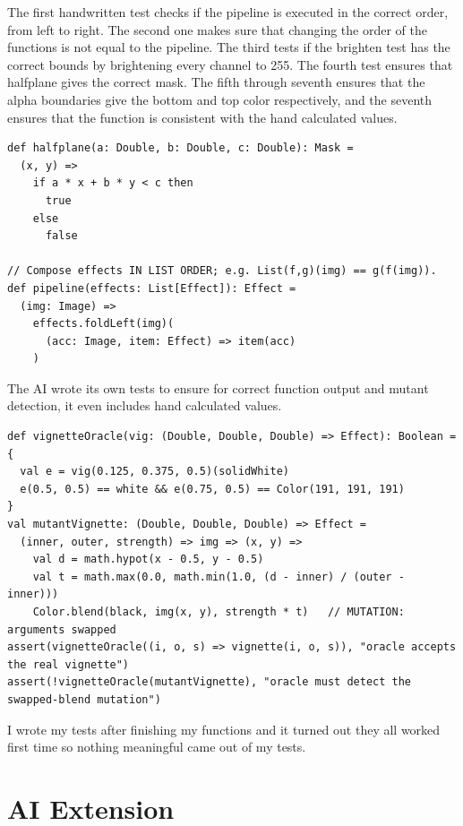 \documentclass[11pt,letterpaper]{article}
\newcommand{\code}[1]{\texttt{#1}}
\begin{document}
The first handwritten test checks if the pipeline is executed in the correct order, from left to right. The second one makes sure that changing the order of the functions is not equal to the pipeline. The third tests if the brighten test has the correct bounds by brightening every channel to 255. The fourth test ensures that halfplane gives the correct mask. The fifth through seventh ensures that the alpha boundaries give the bottom and top color respectively, and the seventh ensures that the function is consistent with the hand calculated values.

\begin{lstlisting}[caption={Functions under test: \code{pipeline} and \code{halfplane} (\code{StudentWork.scala})}]
def halfplane(a: Double, b: Double, c: Double): Mask =
  (x, y) =>
    if a * x + b * y < c then
      true
    else
      false

// Compose effects IN LIST ORDER; e.g. List(f,g)(img) == g(f(img)).
def pipeline(effects: List[Effect]): Effect =
  (img: Image) =>
    effects.foldLeft(img)(
      (acc: Image, item: Effect) => item(acc)
    )
\end{lstlisting}

The AI wrote its own tests to ensure for correct function output and mutant detection, it even includes hand calculated values.

\begin{lstlisting}[caption={Excerpt of the AI-written mutation-detection test (\code{AiChecks} in \code{Preview.scala})}]
def vignetteOracle(vig: (Double, Double, Double) => Effect): Boolean = {
  val e = vig(0.125, 0.375, 0.5)(solidWhite)
  e(0.5, 0.5) == white && e(0.75, 0.5) == Color(191, 191, 191)
}
val mutantVignette: (Double, Double, Double) => Effect =
  (inner, outer, strength) => img => (x, y) =>
    val d = math.hypot(x - 0.5, y - 0.5)
    val t = math.max(0.0, math.min(1.0, (d - inner) / (outer - inner)))
    Color.blend(black, img(x, y), strength * t)   // MUTATION: arguments swapped
assert(vignetteOracle((i, o, s) => vignette(i, o, s)), "oracle accepts the real vignette")
assert(!vignetteOracle(mutantVignette), "oracle must detect the swapped-blend mutation")
\end{lstlisting}

I wrote my tests after finishing my functions and it turned out they all worked first time so nothing meaningful came out of my tests.

\section{AI Extension}
\end{document}
